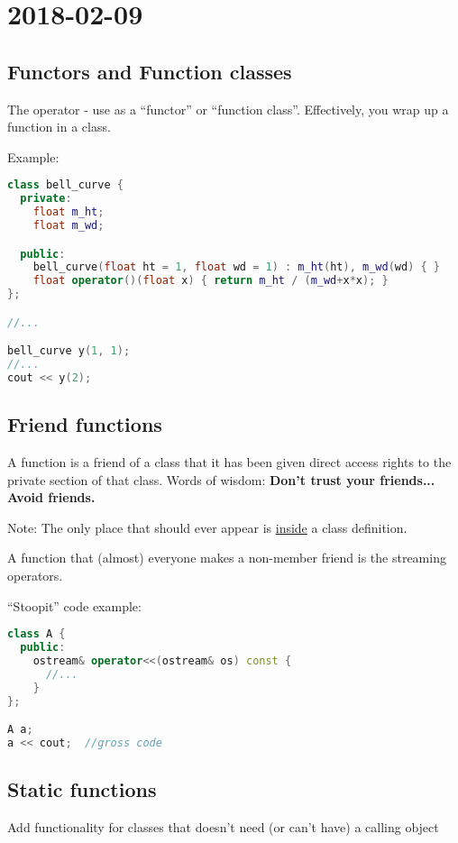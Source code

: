 \section{2018-02-09}

\subsection{Functors and Function classes}

The \cpp{()} operator - use as a ``functor'' or ``function class''. Effectively, you wrap up a function in a class.

Example:

\begin{lstlisting}[language=C++]
class bell_curve {
  private:
    float m_ht;
    float m_wd;

  public:
    bell_curve(float ht = 1, float wd = 1) : m_ht(ht), m_wd(wd) { }
    float operator()(float x) { return m_ht / (m_wd+x*x); }
};

//...

bell_curve y(1, 1);
//...
cout << y(2);
\end{lstlisting}


\subsection{Friend functions}

A function is a friend of a class that it has been given direct access rights to the private section of that class. Words of wisdom: \textbf{Don't trust your friends... Avoid friends.}

Note: The only place that  should ever appear is \underline{inside} a class definition.

A function that (almost) everyone makes a non-member friend is the streaming operators.

``Stoopit'' code example:

\begin{lstlisting}[language=C++]
class A {
  public:
    ostream& operator<<(ostream& os) const {
      //...
    }
};

A a;
a << cout;  //gross code
\end{lstlisting}


\subsection{Static functions}

Add functionality for classes that doesn't need (or can't have) a calling object

